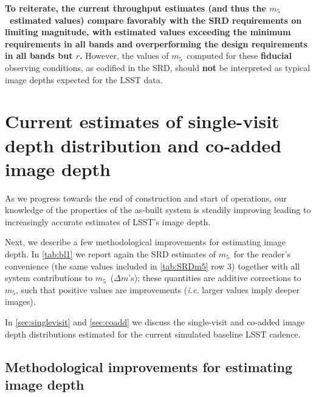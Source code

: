 \documentclass[PST,authoryear,toc]{lsstdoc}
\newcommand{\cm}{\ensuremath{C_m}}
\newcommand{\mf}{\ensuremath{m_5}}
\begin{document}
{\bf To reiterate, the current throughput estimates (and thus the \mf\ estimated values) compare favorably with the SRD requirements on limiting magnitude, with estimated values exceeding the minimum requirements in all bands and overperforming the design requirements in all bands but $r$.} However,
the values of \mf\ computed for these {\bf fiducial} observing conditions, as codified in the SRD,
should {\bf not} be interpreted as typical image depths expected for the LSST data.





\section{Current estimates of single-visit depth distribution and co-added image depth} \label{sec:cadence}
As we progress towards the end of construction and start of operations, our knowledge of the properties of the as-built system is steadily improving leading to increasingly accurate estimates of LSST's image depth.

Next, we describe a few methodological improvements for estimating image depth. In \autoref{tab:bl1} we report again the SRD estimates of \mf\ for the reader's convenience (the same values included in \autoref{tab:SRDm5} row 3) together with all system contributions to \mf\ ($\Delta m$'s); these quantities are additive corrections to \mf, such that positive values are improvements ({\it i.e.} larger values imply deeper images). %

In \autoref{sec:singlevisit} and \autoref{sec:coadd} we discuss the
single-visit and co-added image depth distributions estimated for the current simulated baseline LSST cadence.


\subsection{Methodological improvements for estimating image depth}\label{sec:estdepth}
\end{document}
